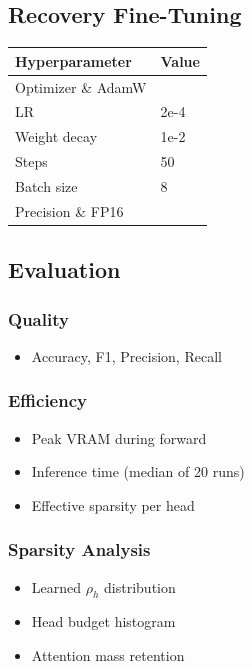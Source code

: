 \subsection{Recovery Fine-Tuning}

\begin{table}[H]
\centering
\small
\begin{tabular}{ll}
\toprule
\textbf{Hyperparameter} & \textbf{Value} \\
\midrule
Optimizer \& AdamW \\
LR & 2e-4 \\
Weight decay & 1e-2 \\
Steps & 50 \\
Batch size & 8 \\
Precision \& FP16 \\
\bottomrule
\end{tabular}
\end{table}

\subsection{Evaluation}

\subsubsection{Quality}
\begin{itemize}
\item Accuracy, F1, Precision, Recall

\end{itemize}
\subsubsection{Efficiency}
\begin{itemize}
\item Peak VRAM during forward
\item Inference time (median of 20 runs)
\item Effective sparsity per head

\end{itemize}
\subsubsection{Sparsity Analysis}
\begin{itemize}
\item Learned $\rho_h$ distribution
\item Head budget histogram
\item Attention mass retention

\end{itemize}
